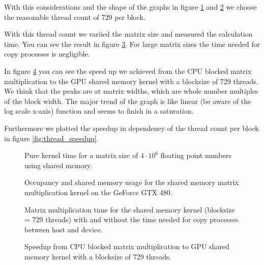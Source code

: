 \documentclass[DIV=12,oneside,a4paper]{scrartcl}
\begin{document}
With this considerations and the shape of the graphs
in figure \ref{fig:sh_thread_count} and \ref{fig:occupancy}
we choose the reasonable thread count of 729 per block.

With this thread count we variied the matrix size and measured
the calculation time. You can see the result in figure \ref{fig:sh_size}.
For large matrix sizes the time needed for copy processes is negligible.

In figure \ref{fig:sh_speedup} you can see the speed up we achieved
from the CPU blocked matrix multiplication to the GPU shared memory
kernel with a blocksize of 729 threads. We think that the peaks are
at matrix widths, which are whole number multiples of the block width.
The major trend of the graph is like linear (be aware of the log scale x-axis)
function and seems to finish in a saturation. 

Furthermore we plotted the speedup in dependency of the thread count
per block in figure \ref{fig:thread_speedup}. 
\begin{figure}
    \begin{center}
        
    \end{center}
    \caption{Pure kernel time for a matrix size of $4\cdot 10^{6}$
        floating point numbers using shared memory.}
    \label{fig:sh_thread_count}
\end{figure}

\begin{figure}
    \begin{center}
        
    \end{center}
    \caption{Occupancy and shared memory usage for the shared memory
        matrix multiplication kernel on the GeForce GTX 480.}
    \label{fig:occupancy}
\end{figure}

\begin{figure}
    \begin{center}
        
    \end{center}
    \caption{Matrix multiplication time for the shared memory kernel
        (blocksize = 729 threads)
        with and without the time needed for copy processes between
        host and device.}
    \label{fig:sh_size}
\end{figure}

\begin{figure}
    \begin{center}
        
    \end{center}
    \caption{Speedup from CPU blocked matrix multiplication to 
        GPU shared memory kernel with a blocksize of 729 threads.}
    \label{fig:sh_speedup}
\end{figure}
\end{document}
